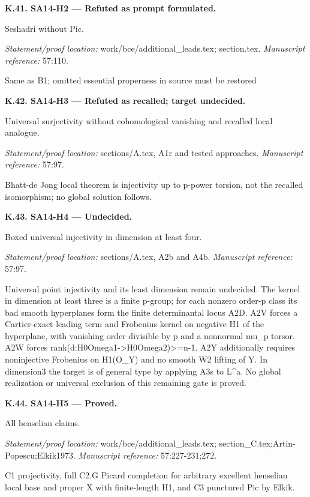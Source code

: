 \par\medskip\noindent\textbf{K.41. SA14-H2 --- Refuted as prompt formulated.}\par
Seshadri without Pic.
\par\emph{Statement/proof location:} work/bce/additional\_leads.tex; section.tex.
\emph{Manuscript reference:} 57:110.
\par Same as B1; omitted essential properness in source must be restored
\par\medskip\noindent\textbf{K.42. SA14-H3 --- Refuted as recalled; target undecided.}\par
Universal surjectivity without cohomological vanishing and recalled local analogue.
\par\emph{Statement/proof location:} sections/A.tex, A1r and tested approaches.
\emph{Manuscript reference:} 57:97.
\par Bhatt-de Jong local theorem is injectivity up to p-power torsion, not the recalled isomorphism; no global solution follows.
\par\medskip\noindent\textbf{K.43. SA14-H4 --- Undecided.}\par
Boxed universal injectivity in dimension at least four.
\par\emph{Statement/proof location:} sections/A.tex, A2b and A4b.
\emph{Manuscript reference:} 57:97.
\par Universal point injectivity and its least dimension remain undecided. The kernel in dimension at least three is a finite p-group; for each nonzero order-p class its bad smooth hyperplanes form the finite determinantal locus A2D. A2V forces a Cartier-exact leading term and Frobenius kernel on negative H1 of the hyperplane, with vanishing order divisible by p and a nonnormal mu\_p torsor. A2W forces rank(d:H0Omega1->H0Omega2)>=n-1. A2Y additionally requires noninjective Frobenius on H1(O\_Y) and no smooth W2 lifting of Y. In dimension3 the target is of general type by applying A3s to L\textasciicircum{}a. No global realization or universal exclusion of this remaining gate is proved.
\par\medskip\noindent\textbf{K.44. SA14-H5 --- Proved.}\par
All henselian claims.
\par\emph{Statement/proof location:} work/bce/additional\_leads.tex; section\_C.tex;Artin-Popescu;Elkik1973.
\emph{Manuscript reference:} 57:227-231;272.
\par C1 projectivity, full C2.G Picard completion for arbitrary excellent henselian local base and proper X with finite-length H1, and C3 punctured Pic by Elkik.
